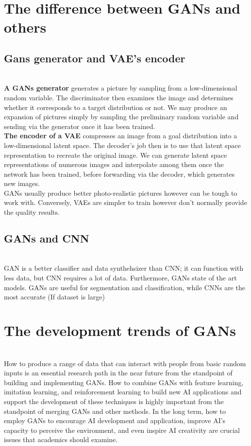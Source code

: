 \documentclass[14pt]{article}
\begin{document}
\section{The difference between GANs and others}

\subsection{Gans generator and VAE's encoder}
\\
\textbf{A GANs generator} generates a picture by sampling from a low-dimensional random variable. The discriminator then examines the image and determines whether it corresponds to a target distribution or not. We may produce an expansion of pictures simply by sampling the preliminary random variable and sending via the generator once it has been trained.\\
\textbf{The encoder of a VAE} compresses an image from a goal distribution into a low-dimensional latent space. The decoder's job then is to use that latent space representation to recreate the original image. We can generate latent space representations of numerous images and interpolate among them once the network has been trained, before forwarding via the decoder, which generates new images.
\\
GANs usually produce better photo-realistic pictures however can be tough to work with. Conversely, VAEs are simpler to train however don’t normally provide the quality results.
\\
\subsection{GANs and CNN}
\\
GAN is a better classifier and data synthehsizer than CNN; it can function with less data, but CNN requires a lot of data. Furthermore, GANs state of the art models. GANs are useful for segmentation and classification, while CNNs are the most accurate (If dataset is large)
\\
\section{The development trends of GANs}
\\
How to produce a range of data that can interact with people from basic random inputs is an essential research path in the near future from the standpoint of building and implementing GANs. How to combine GANs with feature learning, imitation learning, and reinforcement learning to build new AI applications and support the development of these techniques is highly important from the standpoint of merging GANs and other methods. In the long term, how to employ GANs to encourage AI development and application, improve AI's capacity to perceive the environment, and even inspire AI creativity are crucial issues that academics should examine.
\\
\end{document}
